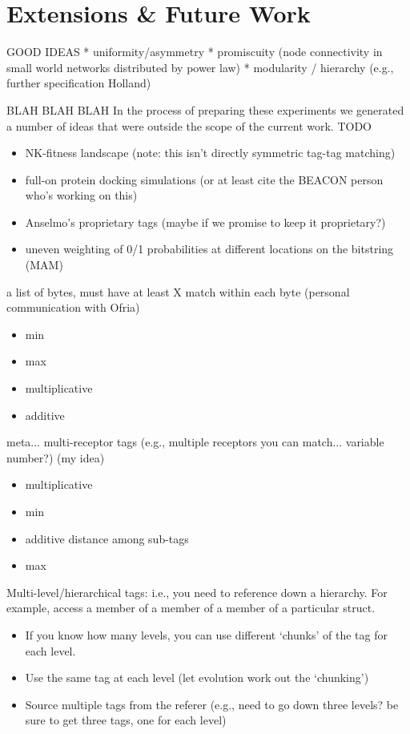 \section{Extensions \& Future Work}


GOOD IDEAS
* uniformity/asymmetry
  * promiscuity (node connectivity in small world networks distributed by power law)
  * modularity / hierarchy (e.g., further specification Holland)


BLAH BLAH BLAH
In the process of preparing these experiments we generated a number of ideas that were outside the scope of the current work.
TODO

\begin{itemize}
\item NK-fitness landscape \citep{kauffman1987towards} (note: this isn't directly symmetric tag-tag matching)
\item full-on protein docking simulations (or at least cite the BEACON person who's working on this)
\item Anselmo's proprietary tags (maybe if we promise to keep it proprietary?)
\item uneven weighting of 0/1 probabilities at different locations on the bitstring (MAM)
\end{itemize}

a list of bytes, must have at least X match within each byte (personal communication with Ofria)
\begin{itemize}
\item min
\item max
\item multiplicative
\item additive
\end{itemize}

meta... multi-receptor tags (e.g., multiple receptors you can match... variable number?) (my idea)
\begin{itemize}
\item multiplicative
\item min
\item additive distance among sub-tags
\item max
\end{itemize}

Multi-level/hierarchical tags: i.e., you need to reference down a hierarchy. For
example, access a member of a member of a member of a particular struct.
\begin{itemize}
  \item If you know how many levels, you can use different `chunks' of the tag for
        each level.
  \item Use the same tag at each level (let evolution work out the `chunking')
  \item Source multiple tags from the referer (e.g., need to go down three levels?
    be sure to get three tags, one for each level)
\end{itemize}

